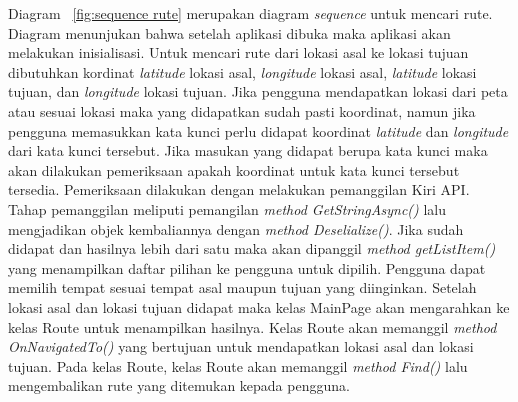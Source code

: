 \hspace{0.5cm} Diagram ~\ref{fig:sequence rute} merupakan diagram \textit{sequence} untuk mencari rute. Diagram menunjukan bahwa setelah aplikasi dibuka maka aplikasi akan melakukan inisialisasi. Untuk mencari rute dari lokasi asal ke lokasi tujuan dibutuhkan kordinat \textit{latitude} lokasi asal, \textit{longitude} lokasi asal, \textit{latitude} lokasi tujuan, dan \textit{longitude} lokasi tujuan. Jika pengguna mendapatkan lokasi dari peta atau sesuai lokasi maka yang didapatkan sudah pasti koordinat, namun jika pengguna memasukkan kata kunci perlu didapat koordinat \textit{latitude} dan \textit{longitude} dari kata kunci tersebut. Jika masukan yang didapat berupa kata kunci maka akan dilakukan pemeriksaan apakah koordinat untuk kata kunci tersebut tersedia. Pemeriksaan dilakukan dengan melakukan pemanggilan Kiri API. Tahap pemanggilan meliputi pemangilan \textit{method GetStringAsync()} lalu mengjadikan objek kembaliannya dengan \textit{method Deselialize()}. Jika sudah didapat dan hasilnya lebih dari satu maka akan dipanggil \textit{method getListItem()} yang menampilkan daftar pilihan ke pengguna untuk dipilih. Pengguna dapat memilih tempat sesuai tempat asal maupun tujuan yang diinginkan. Setelah lokasi asal dan lokasi tujuan didapat maka kelas MainPage akan mengarahkan ke kelas Route untuk menampilkan hasilnya. Kelas Route akan memanggil \textit{method OnNavigatedTo()} yang bertujuan untuk mendapatkan lokasi asal dan lokasi tujuan. Pada kelas Route, kelas Route akan memanggil \textit{method Find()} lalu mengembalikan rute yang ditemukan kepada pengguna.

